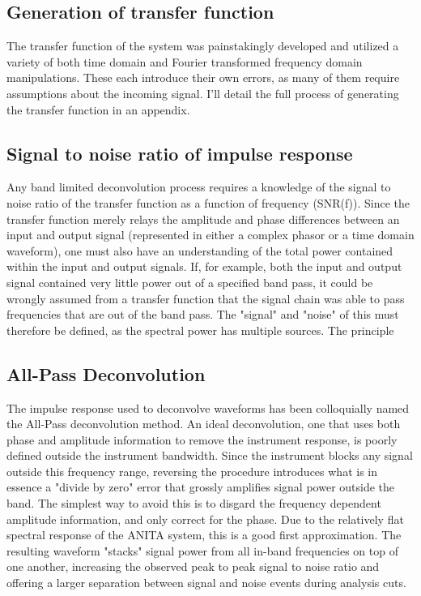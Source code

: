 	\subsection{Generation of transfer function}
		The transfer function of the system was painstakingly developed and utilized a variety of both time domain and Fourier transformed frequency domain manipulations.  These each introduce their own errors, as many of them require assumptions about the incoming signal.  I'll detail the full process of generating the transfer function in an appendix.
	\subsection{Signal to noise ratio of impulse response}
		Any band limited deconvolution process requires a knowledge of the signal to noise ratio of the transfer function as a function of frequency (SNR(f)).  Since the transfer function merely relays the amplitude and phase differences between an input and output signal (represented in either a complex phasor or a time domain waveform), one must also have an understanding of the total power contained within the input and output signals.  If, for example, both the input and output signal contained very little power out of a specified band pass, it could be wrongly assumed from a transfer function that the signal chain was able to pass frequencies that are out of the band pass.
		The "signal" and "noise" of this must therefore be defined, as the spectral power has multiple sources.  The principle   
	\subsection{All-Pass Deconvolution}
		The impulse response used to deconvolve waveforms has been colloquially named the All-Pass deconvolution method.  An ideal deconvolution, one that uses both phase and amplitude information to remove the instrument response, is poorly defined outside the instrument bandwidth.  Since the instrument blocks any signal outside this frequency range, reversing the procedure introduces what is in essence a "divide by zero" error that grossly amplifies signal power outside the band.  The simplest way to avoid this is to disgard the frequency dependent amplitude information, and only correct for the phase.  Due to the relatively flat spectral response of the ANITA system, this is a good first approximation.  The resulting waveform "stacks" signal power from all in-band frequencies on top of one another, increasing the observed peak to peak signal to noise ratio and offering a larger separation between signal and noise events during analysis cuts.

